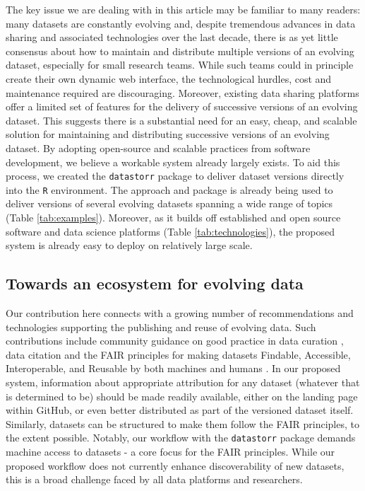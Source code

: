 \documentclass[a4paper,num-refs]{assets/oup-contemporary}
\begin{document}
The key issue we are dealing with in this article may be familiar to many readers: many datasets are constantly evolving and, despite tremendous advances in data sharing and associated technologies over the last decade, there is as yet little consensus about how to maintain and distribute multiple versions of an evolving dataset, especially for small research teams. While such teams could in principle create their own dynamic web interface, the technological hurdles, cost and maintenance required are discouraging. Moreover, existing data sharing platforms offer a limited set of features for the delivery of successive versions of an evolving dataset. This suggests there is a substantial need for an easy, cheap, and scalable solution for maintaining and distributing successive versions of an evolving dataset. By adopting open-source and scalable practices from software development, we believe a workable system already largely exists. To aid this process, we created the \texttt{datastorr} package to deliver dataset versions directly into the \texttt{R} environment. The approach and package is already being used to deliver versions of several evolving datasets spanning a wide range of topics (Table \ref{tab:examples}). Moreover, as it builds off established and open source software and data science platforms (Table \ref{tab:technologies}), the proposed system is already easy to deploy on relatively large scale.

\subsection{Towards an ecosystem for evolving data}

Our contribution here connects with a growing number of recommendations and technologies supporting the publishing and reuse of evolving data. Such contributions include community guidance on good practice in data curation \cite{Goodman-2014, Lowndes-2017}, data citation \cite{Force11-2014} and the FAIR principles for making datasets Findable, Accessible, Interoperable, and Reusable by both machines and humans \cite{Wilkinson-2016}. In our proposed system, information about appropriate attribution for any dataset  (whatever that is determined to be) should be made readily available, either on the landing page within GitHub, or even better distributed as part of the versioned dataset itself. Similarly, datasets can be structured to make them follow the FAIR principles, to the extent possible. Notably, our workflow with the \texttt{datastorr} package demands machine access to datasets - a core focus for the FAIR principles. While our proposed workflow does not currently enhance discoverability of new datasets, this is a broad challenge faced by all data platforms and researchers.
\end{document}
